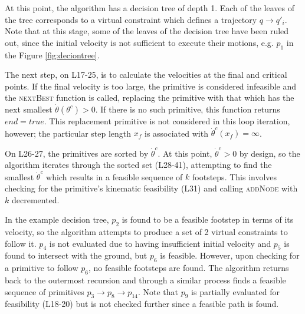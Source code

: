 At this point, the algorithm has a decision tree of depth 1. Each of the leaves of the tree corresponds to a virtual constraint which defines a trajectory $q\to q'_i$. Note that at this stage, some of the leaves of the decision tree have been ruled out, since the initial velocity is not sufficient to execute their motions, e.g. $p_1$ in the Figure \ref{fig:deciontree}.

The next step, on L17-25, is to calculate the velocities at the final and critical points. If the final velocity is too large, the primitive is considered infeasible and the \textsc{nextBest} function is called, replacing the primitive with that which has the next smallest $\dot{\theta}(\theta^c)>0$. If there is no such primitive, this function returns $end=true$. This replacement primitive is not considered in this loop iteration, however; the particular step length $x_f$ is associated with $\dot{\theta}^c(x_f) = \infty$.

On L26-27, the primitives are sorted by $\dot{\theta}^c$. At this point, $\dot{\theta}^c > 0$ by design, so the algorithm iterates through the sorted set (L28-41), attempting to find the smallest $\dot{\theta}^c$ which results in a feasible sequence of $k$ footsteps. This involves checking for the primitive's kinematic feasibility (L31) and calling \textsc{addNode} with $k$ decremented.

In the example decision tree, $p_2$ is found to be a feasible footstep in terms of its velocity, so the algorithm attempts to produce a set of 2 virtual constraints to follow it. $p_4$ is not evaluated due to having insufficient initial velocity and $p_5$ is found to intersect with the ground, but $p_6$ is feasible. However, upon checking for a primitive to follow $p_6$, no feasible footsteps are found. The algorithm returns back to the outermost recursion and through a similar process finds a feasible sequence of primitives $p_3\to p_8 \to p_{14}$. Note that $p_9$ is partially evaluated for feasibility (L18-20) but is not checked further since a feasible path is found.

